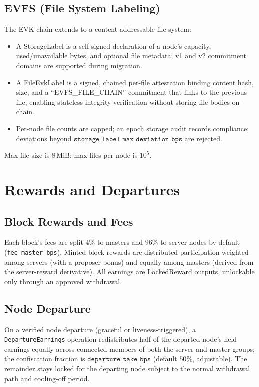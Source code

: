 \documentclass[11pt,a4paper]{article}
\theoremstyle{definition}
\newcommand{\FileEvkLabel}{\textsf{FileEvkLabel}}
\newcommand{\LockedReward}{\textsf{LockedReward}}
\newcommand{\StorageLabel}{\textsf{StorageLabel}}
\begin{document}
\subsection{EVFS (File System Labeling)}
\label{sec:evfs}

The EVK chain extends to a content-addressable file system:
\begin{itemize}[label=--,leftmargin=2em]
  \item A \StorageLabel{} is a self-signed declaration of a node's capacity,
    used/unavailable bytes, and optional file metadata; v1 and v2 commitment
    domains are supported during migration.
  \item A \FileEvkLabel{} is a signed, chained per-file attestation binding
    content hash, size, and a ``EVFS\_FILE\_CHAIN'' commitment that links to the
    previous file, enabling stateless integrity verification without storing
    file bodies on-chain.
  \item Per-node file counts are capped; an epoch storage audit records
    compliance; deviations beyond $\texttt{storage\_label\_max\_deviation\_bps}$
    are rejected.
\end{itemize}
Max file size is $8\,\mathrm{MiB}$; max files per node is $10^5$.

\section{Rewards and Departures}
\label{sec:rewards}

\subsection{Block Rewards and Fees}

Each block's fees are split $4\%$ to masters and $96\%$ to server nodes by
default (\texttt{fee\_master\_bps}).  Minted block rewards are distributed
participation-weighted among servers (with a proposer bonus) and equally among
masters (derived from the server-reward derivative).  All earnings are
\LockedReward{} outputs, unlockable only through an approved withdrawal.

\subsection{Node Departure}
\label{sec:departure}

On a verified node departure (graceful or liveness-triggered), a
\texttt{DepartureEarnings} operation redistributes half of the departed
node's held earnings equally across connected members of both the server and
master groups; the confiscation fraction is
$\texttt{departure\_take\_bps}$ (default $50\%$, adjustable).  The remainder
stays locked for the departing node subject to the normal withdrawal path and
cooling-off period.
\end{document}
